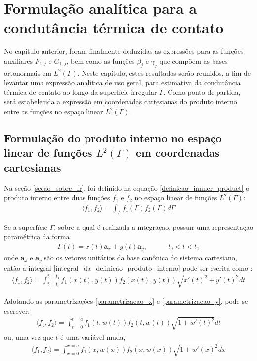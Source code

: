 \section{Formulação analítica para a condutância térmica de contato}

No capítulo anterior, foram finalmente deduzidas as expressões para as funções auxiliares $F_{1,j}$ e $G_{1,j}$, bem como as funções $\beta_j$ e $\gamma_j$ que compõem as bases ortonormais em $L^2(\Gamma)$. Neste capítulo, estes resultados serão reunidos, a fim de levantar uma expressão analítica de uso geral, para estimativa da condutância térmica de contato ao longo da superfície irregular $\Gamma$. Como ponto de partida, será estabelecida a expressão em coordenadas cartesianas do produto interno entre as funções no espaço linear $L^2(\Gamma)$.

\subsection{Formulação do produto interno no espaço linear de funções $L^2(\Gamma)$ em coordenadas cartesianas}

Na seção \ref{secao_sobre_fr}, foi definido na equação \eqref{definicao_innner_product} o produto interno entre duas funções $f_1$ e $f_2$ no espaço linear de funções $L^2(\Gamma)$:
\begin{align}
\langle f_1, f_2\rangle = \int_\Gamma f_1(\Gamma) f_2(\Gamma) d\Gamma \label{integral_da_definicao_produto_interno}
\end{align}

Se a superfície $\Gamma$, sobre a qual é realizada a integração, possuir uma representação paramétrica da forma
\begin{align}
\Gamma(t) = x(t)\mathbf{a}_x + y(t)\mathbf{a}_y, \quad\quad\quad t_0 < t < t_1
\end{align}
onde $\mathbf{a}_x$ e $\mathbf{a}_y$ são os vetores unitários da base canônica do sistema cartesiano, então a integral \eqref{integral_da_definicao_produto_interno} pode ser escrita como \citep{livro_stewart}:
\begin{align}
\langle f_1, f_2\rangle = \int_{t=t_0}^{t=t_1}f_1(x(t), y(t))f_2(x(t), y(t))\sqrt{x'(t)^2 + y'(t)^2}dt \label{integral_da_definicao_produto_interno_2}
\end{align}

Adotando as parametrizações \eqref{parametrizacao_x} e \eqref{parametrizacao_y}, pode-se escrever:
\begin{align} 
\langle f_1, f_2\rangle = \int_{t=0}^{t=a}f_1(t, w(t))f_2(t, w(t))\sqrt{1 + w'(t)^2}dt \label{integral_da_definicao_produto_interno_3}
\end{align}
ou, uma vez que $t$ é uma variável muda,
\begin{align}
\langle f_1, f_2\rangle = \int_{x=0}^{x=a}f_1(x, w(x))f_2(x, w(x))\sqrt{1 + w'(x)^2}dx \label{integral_da_definicao_produto_interno_4}
\end{align}

